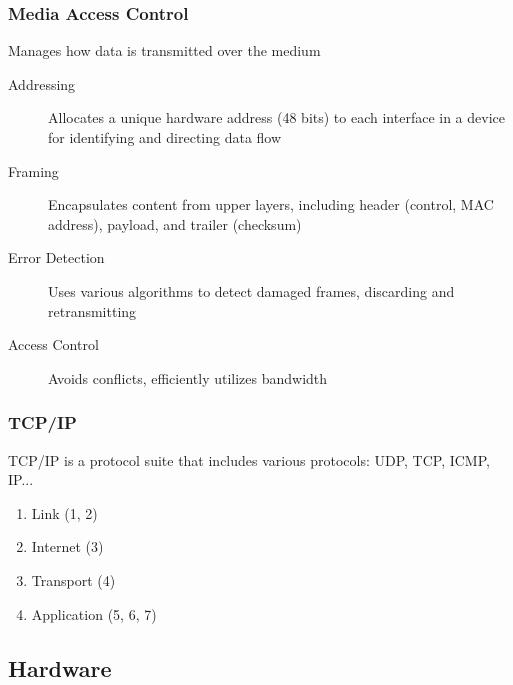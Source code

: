 \documentclass[11pt,journal,compsoc]{IEEEtran}
\begin{document}
\subsubsection{Media Access Control}

Manages how data is transmitted over the medium

\begin{description}
    \item[Addressing] Allocates a unique hardware address (48 bits) to each interface in a device for identifying and directing data flow
    
    \item[Framing] Encapsulates content from upper layers, including header (control, MAC address), payload, and trailer (checksum)
    
    \item[Error Detection] Uses various algorithms to detect damaged frames, discarding and retransmitting
    
    \item[Access Control] Avoids conflicts, efficiently utilizes bandwidth
\end{description}


\subsubsection{TCP/IP}

TCP/IP is a protocol suite that includes various protocols: UDP, TCP, ICMP, IP...

\begin{enumerate}
    \item Link (1, 2)
    \item Internet (3)
    \item Transport (4)
    \item Application (5, 6, 7)
\end{enumerate}


\subsection{Hardware}
\end{document}
